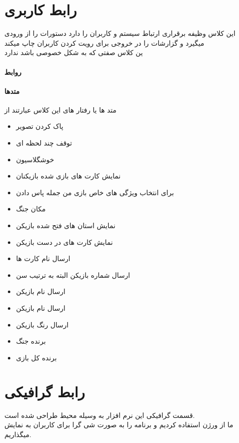 \documentclass[pdf,titlepage,a4paper]{report}
\begin{document}
	\section{رابط کاربری}
	این کلاس وظیفه برقراری ارتباط سیستم و کاربران را دارد دستورات را از ورودی میگیرد و گزارشات را در خروجی برای رویت کردن کاربران چاپ میکند\\
    ین کلاس صفتی که به شکل خصوصی باشد ندارد 
	\paragraph{روابط}
	
	\paragraph{متدها}
	متد ها یا رفتار های این کلاس عبارتند از 
	\begin{itemize}
		\item {}  پاک کردن تصویر 
		\item {}  توقف چند لحظه ای 
		\item {}  خوشگلاسیون
		\item {} نمایش کارت های بازی شده بازیکنان
		\item {} برای انتخاب ویژگی های خاص بازی من جمله پاس دادن
		\item {} مکان جنگ
		\item {}  نمایش استان های فتح شده بازیکن 
		\item {}  نمایش کارت های در دست بازیکن
		\item {} ارسال نام کارت ها
		\item {}  ارسال شماره بازیکن البته به ترتیب سن
		\item {}  ارسال نام بازیکن
		\item {}   ارسال نام بازیکن
		\item {}  ارسال رنگ بازیکن 
		\item {} برنده جنگ
		\item {}  برنده کل بازی 
	\end{itemize}
	
	\newpage
	\section{رابط گرافیکی}
قسمت گرافیکی این نرم افزار به وسیله محیط  طراحی شده است. \\
ما از ورژن  استفاده کردیم و برنامه را به صورت شی گرا برای کاربران به نمایش میگذاریم.\\
    
\end{document}
